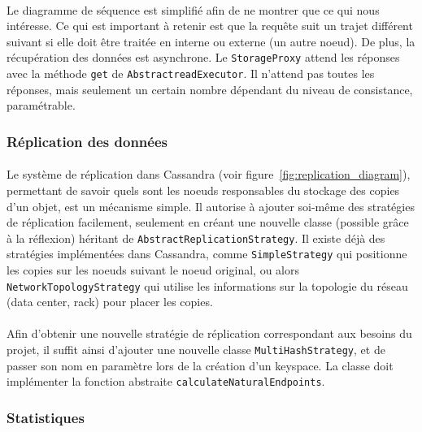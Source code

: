 \documentclass[12pt]{article}
\newcommand{\class}[1]{\texttt{#1}}
\begin{document}
\paragraph{}Le diagramme de séquence est simplifié afin de ne montrer que ce qui nous intéresse. Ce qui est important à retenir est que la requête suit un trajet différent suivant si elle doit être traitée en interne ou externe (un autre noeud). De plus, la récupération des données est asynchrone. Le \class{StorageProxy} attend les réponses avec la méthode \texttt{get} de \class{AbstractreadExecutor}. Il n'attend pas toutes les réponses, mais seulement un certain nombre dépendant du niveau de consistance, paramétrable.

\subsubsection{Réplication des données}

\paragraph{}Le système de réplication dans Cassandra (voir figure~\ref{fig:replication_diagram}), permettant de savoir quels sont les noeuds responsables du stockage des copies d'un objet, est un mécanisme simple. Il autorise à ajouter soi-même des stratégies de réplication facilement, seulement en créant une nouvelle classe (possible grâce à la réflexion) héritant de \class{AbstractReplicationStrategy}. Il existe déjà des stratégies implémentées dans Cassandra, comme \class{SimpleStrategy} qui positionne les copies sur les noeuds suivant le noeud original, ou alors \class{NetworkTopologyStrategy} qui utilise les informations sur la topologie du réseau (data center, rack) pour placer les copies.

\paragraph{}Afin d'obtenir une nouvelle stratégie de réplication correspondant aux besoins du projet, il suffit ainsi d'ajouter une nouvelle classe \class{MultiHashStrategy}, et de passer son nom en paramètre lors de la création d'un keyspace. La classe doit implémenter la fonction abstraite \texttt{calculateNaturalEndpoints}.

\subsubsection{Statistiques}
\end{document}
